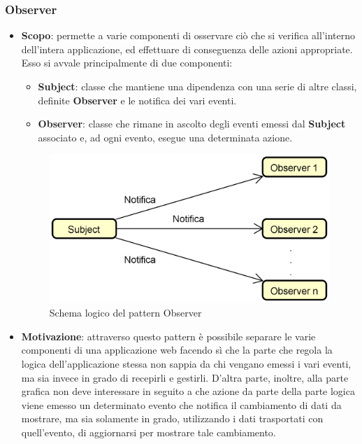 \subsubsection{Observer}
\begin{itemize}
	\item \textbf{Scopo}: permette a varie componenti di osservare ciò che si verifica all'interno dell'intera applicazione, ed effettuare di conseguenza delle azioni appropriate. Esso si avvale principalmente di due componenti: 
		  \begin{itemize}
		  	 	\item \textbf{Subject}: classe che mantiene una dipendenza con una serie di altre classi, definite \textbf{Observer} e le notifica dei vari eventi.
		  	 	\item \textbf{Observer}: classe che rimane in ascolto degli eventi emessi dal \textbf{Subject} associato e, ad ogni evento, esegue una determinata azione.
		  \end{itemize}
		  \begin{figure}[H]
		  \centering
		  \includegraphics[scale=0.3]{Sezioni/DesignPatterns/Observer.png}
		  \caption{Schema logico del pattern Observer}
		  \end{figure}
	\item \textbf{Motivazione}: attraverso questo pattern è possibile separare le varie componenti di una applicazione web facendo sì che la parte che regola la logica dell'applicazione stessa non sappia da chi vengano emessi i vari eventi, ma sia invece in grado di recepirli e gestirli. D'altra parte, inoltre, alla parte grafica non deve interessare in seguito a che azione da parte della parte logica viene emesso un determinato evento che notifica il cambiamento di dati da mostrare, ma sia solamente in grado, utilizzando i dati trasportati con quell'evento, di aggiornarsi per mostrare tale cambiamento.

\end{itemize}
